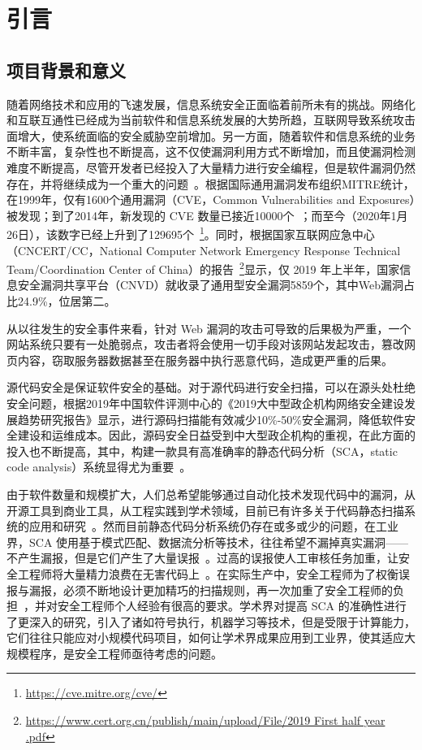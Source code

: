 \chapter{引言}

\section{项目背景和意义}
随着网络技术和应用的飞速发展，信息系统安全正面临着前所未有的挑战。网络化和互联互通性已经成为当前软件和信息系统发展的大势所趋，互联网导致系统攻击面增大，使系统面临的安全威胁空前增加。另一方面，随着软件和信息系统的业务不断丰富，复杂性也不断提高，这不仅使漏洞利用方式不断增加，而且使漏洞检测难度不断提高，尽管开发者已经投入了大量精力进行安全编程，但是软件漏洞仍然存在，并将继续成为一个重大的问题~\cite{vuldeepecker}。根据国际通用漏洞发布组织MITRE统计，在1999年，仅有1600个通用漏洞（CVE，Common Vulnerabilities and Exposures）被发现；到了2014年，新发现的 CVE 数量已接近10000个~\cite{liujian2018}；而至今（2020年1月26日），该数字已经上升到了129695个~\footnote{\url{https://cve.mitre.org/cve/}}。同时，根据国家互联网应急中心（CNCERT/CC，National Computer Network Emergency Response Technical Team/Coordination Center of China）的报告~\footnote{\url{https://www.cert.org.cn/publish/main/upload/File/2019 First half year .pdf}}显示，仅 2019 年上半年，国家信息安全漏洞共享平台（CNVD）就收录了通用型安全漏洞5859个，其中Web漏洞占比24.9\%，位居第二。

从以往发生的安全事件来看，针对 Web 漏洞的攻击可导致的后果极为严重，一个网站系统只要有一处脆弱点，攻击者将会使用一切手段对该网站发起攻击，篡改网页内容，窃取服务器数据甚至在服务器中执行恶意代码，造成更严重的后果。

源代码安全是保证软件安全的基础。对于源代码进行安全扫描，可以在源头处杜绝安全问题，根据2019年中国软件评测中心的《2019大中型政企机构网络安全建设发展趋势研究报告》显示，进行源码扫描能有效减少10\%-50\%安全漏洞，降低软件安全建设和运维成本。因此，源码安全日益受到中大型政企机构的重视，在此方面的投入也不断提高，其中，构建一款具有高准确率的静态代码分析（SCA，static code analysis）系统显得尤为重要~\cite{aletheia}。

由于软件数量和规模扩大，人们总希望能够通过自动化技术发现代码中的漏洞，从开源工具到商业工具，从工程实践到学术领域，目前已有许多关于代码静态扫描系统的应用和研究~\cite{li2016vulpecker,leopard,sym:exe,taint:finding,vuldeepecker,taint:taj,Koc2019,sym:cute,atp:saturn,sym:klee,atp:escjava,Koc2017,pixy,aletheia}。然而目前静态代码分析系统仍存在或多或少的问题，在工业界，SCA 使用基于模式匹配、数据流分析等技术，往往希望不漏掉真实漏洞——不产生漏报，但是它们产生了大量误报~\cite{falseAlarm,aletheia,falsepositive}。过高的误报使人工审核任务加重，让安全工程师将大量精力浪费在无害代码上~\cite{leopard}。在实际生产中，安全工程师为了权衡误报与漏报，必须不断地设计更加精巧的扫描规则，再一次加重了安全工程师的负担~\cite{taintStyle,vuldeepecker}，并对安全工程师个人经验有很高的要求。学术界对提高 SCA 的准确性进行了更深入的研究，引入了诸如符号执行，机器学习等技术，但是受限于计算能力，它们往往只能应对小规模代码项目，如何让学术界成果应用到工业界，使其适应大规模程序，是安全工程师亟待考虑的问题。


